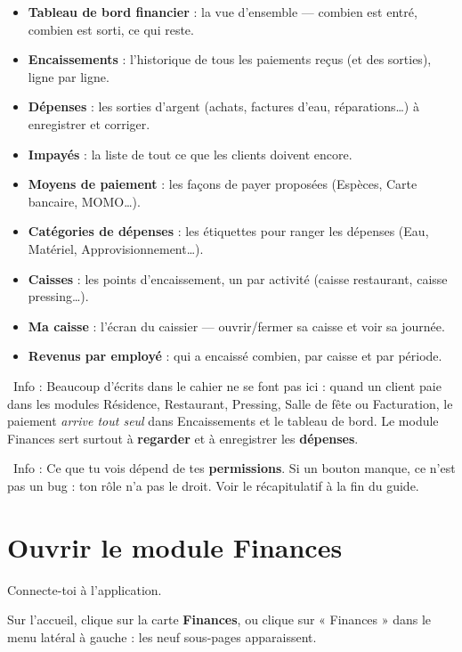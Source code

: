 \documentclass[12pt,a4paper]{article}
\newcommand{\info}[1]{\par\noindent\textcolor{lagoon}{\faInfoCircle\ Info : #1}\par}
\begin{document}
\begin{itemize}[label=\textcolor{lagoon}{\faCoins}]
  \item \textbf{Tableau de bord financier} : la vue d'ensemble — combien est entré, combien est sorti, ce qui reste.
  \item \textbf{Encaissements} : l'historique de tous les paiements reçus (et des sorties), ligne par ligne.
  \item \textbf{Dépenses} : les sorties d'argent (achats, factures d'eau, réparations\ldots) à enregistrer et corriger.
  \item \textbf{Impayés} : la liste de tout ce que les clients doivent encore.
  \item \textbf{Moyens de paiement} : les façons de payer proposées (Espèces, Carte bancaire, MOMO\ldots).
  \item \textbf{Catégories de dépenses} : les étiquettes pour ranger les dépenses (Eau, Matériel, Approvisionnement\ldots).
  \item \textbf{Caisses} : les points d'encaissement, un par activité (caisse restaurant, caisse pressing\ldots).
  \item \textbf{Ma caisse} : l'écran du caissier — ouvrir/fermer sa caisse et voir sa journée.
  \item \textbf{Revenus par employé} : qui a encaissé combien, par caisse et par période.
\end{itemize}

\info{Beaucoup d'écrits dans le cahier ne se font pas ici : quand un client paie dans les modules Résidence, Restaurant, Pressing, Salle de fête ou Facturation, le paiement \emph{arrive tout seul} dans Encaissements et le tableau de bord. Le module Finances sert surtout à \textbf{regarder} et à enregistrer les \textbf{dépenses}.}

\info{Ce que tu vois dépend de tes \textbf{permissions}. Si un bouton manque, ce n'est pas un bug : ton rôle n'a pas le droit. Voir le récapitulatif à la fin du guide.}

\newpage

\section{Ouvrir le module Finances}\label{sec:ouvrir}

\begin{etapes}
  \item Connecte-toi à l'application.
  \item Sur l'accueil, clique sur la carte \textbf{Finances}, ou clique sur « Finances » dans le menu latéral à gauche : les neuf sous-pages apparaissent.
\end{etapes}
\end{document}
